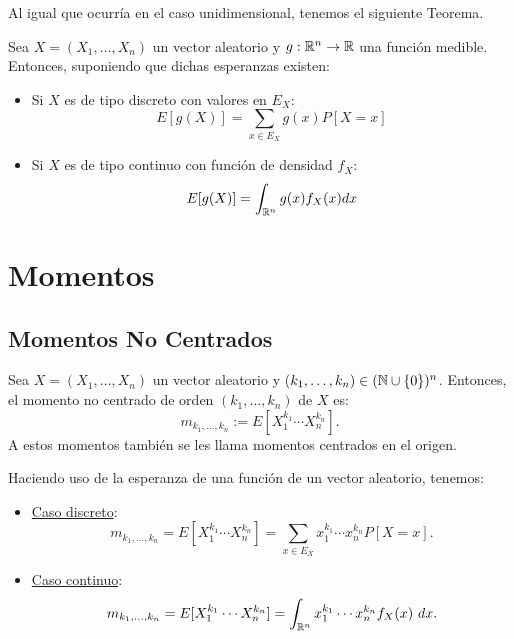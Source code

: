 Al igual que ocurría en el caso unidimensional, tenemos el siguiente Teorema.
\begin{teo}
    Sea $X=(X_1,\dots,X_n)$ un vector aleatorio y $g:\mathbb{R}^n\to \mathbb{R}$ una función medible. Entonces, suponiendo que dichas esperanzas existen:
    \begin{itemize}
        \item Si $X$ es de tipo discreto con valores en $E_X$:
        \begin{equation*}
            E[g(X)] = \sum_{x\in E_X}g(x)P[X=x]
        \end{equation*}

        \item Si $X$ es de tipo continuo con función de densidad $f_X$:
        \begin{equation*}
            E[g(X)] = \int_{\mathbb{R}^n} g(x)f_X(x) dx
        \end{equation*}
    \end{itemize}
\end{teo}

\section{Momentos}

\subsection{Momentos No Centrados}

\begin{definicion}
    Sea $X=(X_1,\dots,X_n)$ un vector aleatorio y ($k_1,\dots,k_n)\in (\mathbb{N}\cup \{0\})^n$. Entonces, el momento no centrado de orden $(k_1,\dots,k_n)$ de $X$ es:
    \begin{equation*}
        m_{k_1,\dots,k_n} := E[X_1^{k_1}\cdots X_n^{k_n}].
    \end{equation*}
    A estos momentos también se les llama momentos centrados en el origen.
\end{definicion}

Haciendo uso de la esperanza de una función de un vector aleatorio, tenemos:
\begin{itemize}
    \item \ul{Caso discreto}:
    \begin{equation*}
        m_{k_1,\dots,k_n}=E[X_1^{k_1}\cdots X_n^{k_n}] = \sum_{x\in E_X} x_1^{k_1}\cdots x_n^{k_n} P[X=x].
    \end{equation*}

    \item \ul{Caso continuo}:
    \begin{equation*}
        m_{k_1,\dots,k_n}=E[X_1^{k_1}\cdots X_n^{k_n}] = \int_{\mathbb{R}^n} x_1^{k_1}\cdots x_n^{k_n} f_X(x)~d x.
    \end{equation*}
\end{itemize}

